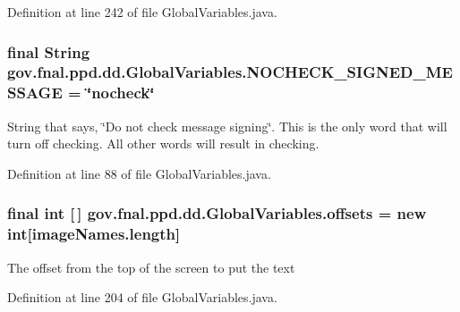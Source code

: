 Definition at line 242 of file Global\-Variables.\-java.

\hypertarget{classgov_1_1fnal_1_1ppd_1_1dd_1_1GlobalVariables_a83097f18e0ffe08a8a7ae97f883ee471}{
\subsubsection[{N\-O\-C\-H\-E\-C\-K\-\_\-\-S\-I\-G\-N\-E\-D\-\_\-\-M\-E\-S\-S\-A\-G\-E}]{\setlength{\rightskip}{0pt plus 5cm}final String gov.\-fnal.\-ppd.\-dd.\-Global\-Variables.\-N\-O\-C\-H\-E\-C\-K\-\_\-\-S\-I\-G\-N\-E\-D\-\_\-\-M\-E\-S\-S\-A\-G\-E = \char`\"{}nocheck\char`\"{}\hspace{0.3cm}{\ttfamily [static]}}}\label{classgov_1_1fnal_1_1ppd_1_1dd_1_1GlobalVariables_a83097f18e0ffe08a8a7ae97f883ee471}
String that says, \char`\"{}\-Do not check message signing\char`\"{}. This is the only word that will turn off checking. All other words will result in checking. 

Definition at line 88 of file Global\-Variables.\-java.

\hypertarget{classgov_1_1fnal_1_1ppd_1_1dd_1_1GlobalVariables_aa46c72aaa61e4f90401679376f6071f5}{
\subsubsection[{offsets}]{\setlength{\rightskip}{0pt plus 5cm}final int \mbox{[}$\,$\mbox{]} gov.\-fnal.\-ppd.\-dd.\-Global\-Variables.\-offsets = new int\mbox{[}image\-Names.\-length\mbox{]}\hspace{0.3cm}{\ttfamily [static]}}}\label{classgov_1_1fnal_1_1ppd_1_1dd_1_1GlobalVariables_aa46c72aaa61e4f90401679376f6071f5}
The offset from the top of the screen to put the text 

Definition at line 204 of file Global\-Variables.\-java.

